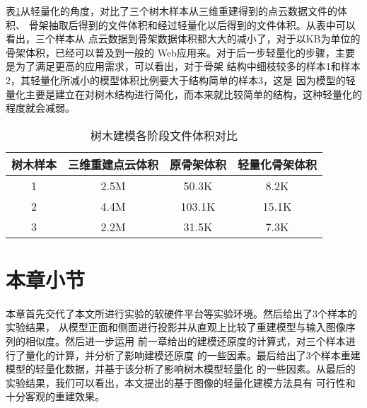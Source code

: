 表\ref{tab:lw}从轻量化的角度，对比了三个树木样本从三维重建得到的点云数据文件的体积、
骨架抽取后得到的文件体积和经过轻量化以后得到的文件体积。从表中可以看出，三个样本从
点云数据到骨架数据体积都大大的减小了，对于以KB为单位的骨架体积，已经可以普及到一般的
Web应用来。对于后一步轻量化的步骤，主要是为了满足更高的应用需求，可以看出，对于骨架
结构中细枝较多的样本1和样本2，其轻量化所减小的模型体积比例要大于结构简单的样本3，这是
因为模型的轻量化主要是建立在对树木结构进行简化，而本来就比较简单的结构，这种轻量化的
程度就会减弱。
\\
\begin{table}[H]
	\caption{树木建模各阶段文件体积对比}
	\centering
	\begin{tabular}{c|ccc} \label{tab:lw}
		树木样本	&	三维重建点云体积	& 原骨架体积	& 轻量化骨架体积\\
		\hline
		1			&   2.5M				& 50.3K			& 8.2K\\
		2			&	4.4M				& 103.1K		& 15.1K\\
		3			&	2.2M				& 31.5K			& 7.3K\\
	\end{tabular}
\end{table}

\section{本章小节}
本章首先交代了本文所进行实验的软硬件平台等实验环境。然后给出了3个样本的实验结果，
从模型正面和侧面进行投影并从直观上比较了重建模型与输入图像序列的相似度。然后进一步运用
前一章给出的建模还原度的计算式，对三个样本进行了量化的计算，并分析了影响建模还原度
的一些因素。最后给出了3个样本重建模型的轻量化数据，并基于该分析了影响树木模型轻量化
的一些因素。从最后的实验结果，我们可以看出，本文提出的基于图像的轻量化建模方法具有
可行性和十分客观的重建效果。
